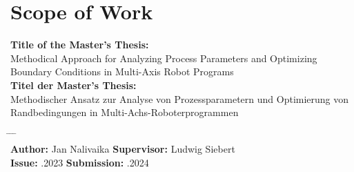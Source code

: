 \chapter*{Scope of Work}


\textbf{Title of the Master's Thesis:}\\
\Large{Methodical Approach for Analyzing Process Parameters and Optimizing Boundary Conditions in Multi-Axis Robot Programs}\\
\newline
\normalsize{\textbf{Titel der Master's Thesis:}}\\
\Large{Methodischer Ansatz zur Analyse von Prozessparametern und Optimierung von Randbedingungen in Multi-Achs-Roboterprogrammen}
\normalsize

\begin{tabbing}
	\hspace{7em} 		\= \hspace{13em}			\= \hspace{7em} 		\= \kill
				\> 						\> \\
	\textbf{Author:} \>  Jan Nalivaika	\> \textbf{Supervisor:} 	\>Ludwig Siebert  \\
	\textbf{Issue:} 	.2023	\> \textbf{Submission:} 	.2024
\end{tabbing}

